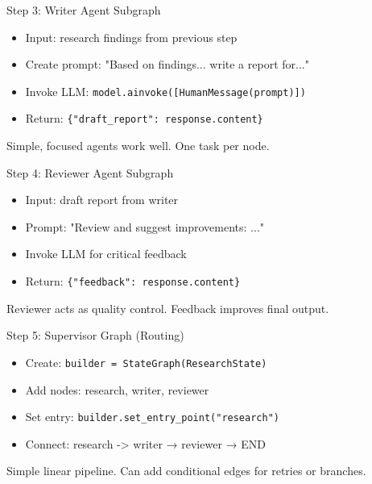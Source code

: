 \documentclass[aspectratio=169,11pt]{beamer}
\begin{document}
\begin{frame}{Step 3: Writer Agent Subgraph}
\setlength{\itemsep}{1pt}
\begin{itemize}
\item Input: research findings from previous step
\item Create prompt: "Based on findings... write a report for..."
\item Invoke LLM: \texttt{model.ainvoke([HumanMessage(prompt)])}
\item Return: \texttt{\{"draft\_report": response.content\}}
\end{itemize}
\vspace{0.1cm}
\begin{tipbox}
Simple, focused agents work well. One task per node.
\end{tipbox}
\end{frame}

\begin{frame}{Step 4: Reviewer Agent Subgraph}
\setlength{\itemsep}{1pt}
\begin{itemize}
\item Input: draft report from writer
\item Prompt: "Review and suggest improvements: ..."
\item Invoke LLM for critical feedback
\item Return: \texttt{\{"feedback": response.content\}}
\end{itemize}
\vspace{0.1cm}
\begin{tipbox}
Reviewer acts as quality control. Feedback improves final output.
\end{tipbox}
\end{frame}

\begin{frame}{Step 5: Supervisor Graph (Routing)}
\setlength{\itemsep}{1pt}
\begin{itemize}
\item Create: \texttt{builder = StateGraph(ResearchState)}
\item Add nodes: research, writer, reviewer
\item Set entry: \texttt{builder.set\_entry\_point("research")}
\item Connect: research -> writer → reviewer → END
\end{itemize}
\vspace{0.1cm}
\begin{tipbox}
Simple linear pipeline. Can add conditional edges for retries or branches.
\end{tipbox}
\end{frame}
\end{document}
